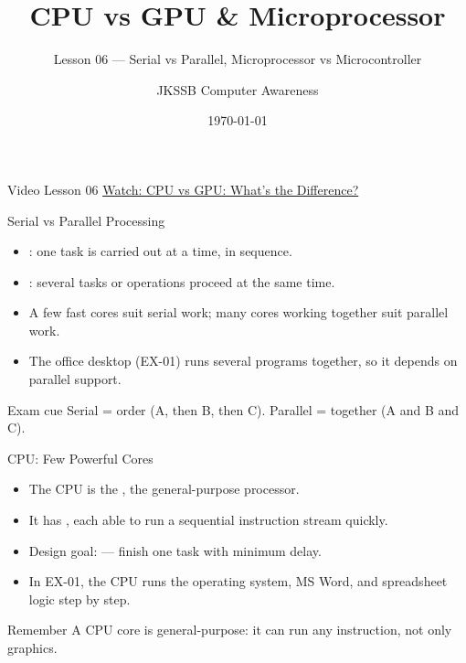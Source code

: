 \documentclass[aspectratio=169]{beamer}
\title{CPU vs GPU \& Microprocessor}
\subtitle{Lesson 06 --- Serial vs Parallel, Microprocessor vs Microcontroller}
\author{JKSSB Computer Awareness}
\date{\today}
\begin{document}
\frame{\titlepage}

\begin{frame}{Video Lesson 06}
  \centering
  \Large\href{https://youtu.be/Vaod5Ox7lzM}{Watch: CPU vs GPU: What's the Difference?}
\end{frame}

\begin{frame}{Serial vs Parallel Processing}
  \begin{itemize}
    \item {}: one task is carried out at a time, in
      sequence.
    \item {}: several tasks or operations proceed at
      the same time.
    \item A few fast cores suit serial work; many cores working together suit
      parallel work.
    \item The office desktop (EX-01) runs several programs together, so it
      depends on parallel support.
  \end{itemize}
  \begin{block}{Exam cue}
    Serial = order (A, then B, then C). Parallel = together (A and B and C).
  \end{block}
\end{frame}

\begin{frame}{CPU: Few Powerful Cores}
  \begin{itemize}
    \item The CPU is the , the general-purpose
      processor.
    \item It has , each able to run a sequential
      instruction stream quickly.
    \item Design goal:  --- finish one task with minimum
      delay.
    \item In EX-01, the CPU runs the operating system, MS Word, and
      spreadsheet logic step by step.
  \end{itemize}
  \begin{alertblock}{Remember}
    A CPU core is general-purpose: it can run any instruction, not only
    graphics.
  \end{alertblock}
\end{frame}
\end{document}
